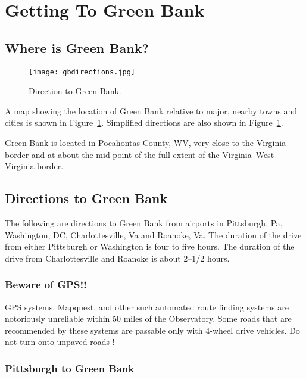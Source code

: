 \section{Getting To Green Bank}


\subsection{Where is Green Bank?}

\begin{figure}
\texttt{[image: gbdirections.jpg]}
\caption[Directions to Green Bank]{Direction to Green Bank.
\label{fig:directions}
}
\end{figure}

A map showing the location of Green Bank relative to major, nearby
towns and cities is shown in Figure~\ref{fig:directions}.  Simplified
directions are also shown in Figure~\ref{fig:directions}.

Green Bank is located in Pocahontas County, WV, very close to the Virginia
border and at about the mid-point of the full extent of the Virginia--West
Virginia border.


\subsection{Directions to Green Bank}

  The following are directions to Green Bank from airports in 
Pittsburgh, Pa, Washington, DC, Charlottesville, Va and Roanoke, Va. The 
duration of the drive from either Pittsburgh or Washington is 
four to five hours. The duration of the drive from Charlottesville 
and Roanoke is about 2--1/2 hours.

\subsubsection{Beware of GPS!!}

GPS systems, Mapquest, and other such automated route finding systems
are notoriously unreliable within 50 miles of the Observatory.
Some roads that are recommended by these systems are passable only with
4-wheel drive vehicles.
Do not turn onto unpaved roads !


\subsubsection{Pittsburgh to Green Bank}

